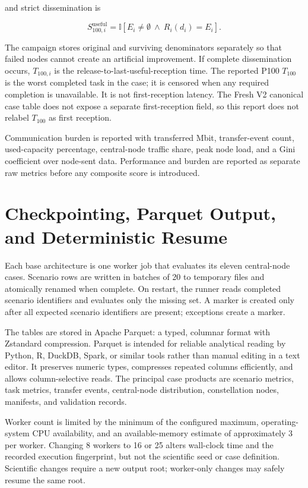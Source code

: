 and strict dissemination is

\begin{equation}
S^{\mathrm{useful}}_{100,i}=\mathbb{I}[E_i\neq\emptyset\ \land\ R_i(d_i)=E_i].
\end{equation}

The campaign stores original and surviving denominators separately so that failed nodes cannot create an artificial improvement. If complete dissemination occurs, $T_{100,i}$ is the release-to-last-useful-reception time. The reported P100 $T_{100}$ is the worst completed task in the case; it is censored when any required completion is unavailable. It is not first-reception latency. The Fresh V2 canonical case table does not expose a separate first-reception field, so this report does not relabel $T_{100}$ as first reception.

Communication burden is reported with transferred Mbit, transfer-event count, used-capacity percentage, central-node traffic share, peak node load, and a Gini coefficient over node-sent data. Performance and burden are reported as separate raw metrics before any composite score is introduced.

\section{Checkpointing, Parquet Output, and Deterministic Resume}

Each base architecture is one worker job that evaluates its eleven central-node cases. Scenario rows are written in batches of 20 to temporary files and atomically renamed when complete. On restart, the runner reads completed scenario identifiers and evaluates only the missing set. A  marker is created only after all expected scenario identifiers are present; exceptions create a  marker.

The tables are stored in Apache Parquet: a typed, columnar format with Zstandard compression. Parquet is intended for reliable analytical reading by Python, R, DuckDB, Spark, or similar tools rather than manual editing in a text editor. It preserves numeric types, compresses repeated columns efficiently, and allows column-selective reads. The principal case products are scenario metrics, task metrics, transfer events, central-node distribution, constellation nodes, manifests, and validation records.

Worker count is limited by the minimum of the configured maximum, operating-system CPU availability, and an available-memory estimate of approximately \SI{3}{\gibi\byte} per worker. Changing 8 workers to 16 or 25 alters wall-clock time and the recorded execution fingerprint, but not the scientific seed or case definition. Scientific changes require a new output root; worker-only changes may safely resume the same root.

